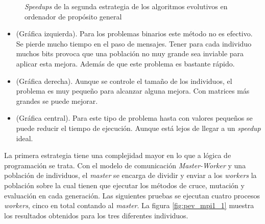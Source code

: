 		\begin{figure}[!h]
		\centering
		\caption{\textit{Speedups} de la segunda estrategia de los algoritmos evolutivos en ordenador de propósito general}
		\label{fig:pev_mpi1_speedups}
		\end{figure}
		
		
		\newpage
		
		\begin{itemize}
			\item (Gráfica izquierda). Para los problemas binarios este método no es efectivo. Se pierde mucho tiempo en el paso de mensajes. Tener para cada individuo muchos bits provoca que una población no muy grande sea inviable para aplicar esta mejora. Además de que este problema es bastante rápido.
			\item (Gráfica derecha). Aunque se controle el tamaño de los individuos, el problema es muy pequeño para alcanzar alguna mejora. Con matrices más grandes se puede mejorar.
			\item (Gráfica central). Para este tipo de problema hasta con valores pequeños se puede reducir el tiempo de ejecución. Aunque está lejos de llegar a un \textit{speedup} ideal.
		\end{itemize}
	
		La primera estrategia tiene una complejidad mayor en lo que a lógica de programación se trata. Con el modelo de comunicación \textit{Master-Worker} y una población de individuos, el \textit{master} se encarga de dividir y enviar a los \textit{workers} la población sobre la cual tienen que ejecutar los métodos de cruce, mutación y evaluación en cada generación. Las siguientes pruebas se ejecutan cuatro procesos \textit{workers}, cinco en total contando al \textit{master}. La figura \ref{fig:pev_mpi1_1} muestra los resultados obtenidos para los tres diferentes individuos. 
		
